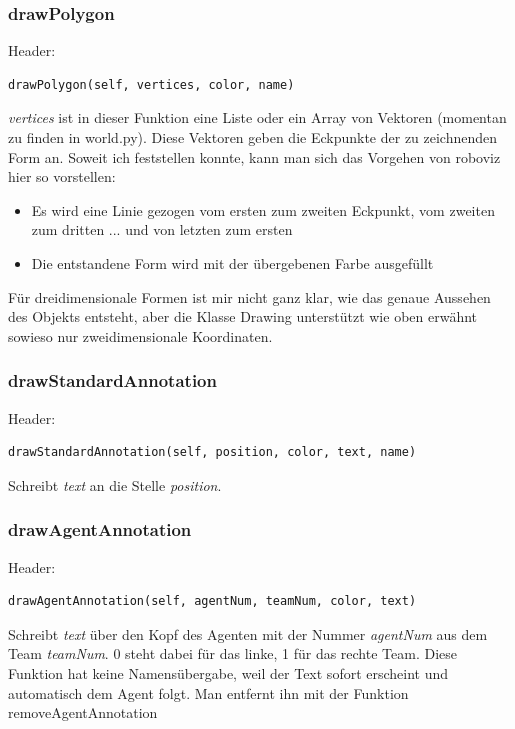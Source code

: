 \subsubsection*{drawPolygon}
Header:

\begin{verbatim}drawPolygon(self, vertices, color, name)
\end{verbatim}
\textit{vertices} ist in dieser Funktion eine Liste oder ein Array von 
Vektoren (momentan zu finden in world.py). Diese Vektoren geben die 
Eckpunkte der zu zeichnenden Form an. Soweit ich feststellen konnte, kann
 man sich das Vorgehen von roboviz hier so vorstellen:

\begin{itemize}
\item Es wird eine Linie gezogen vom ersten zum zweiten Eckpunkt, vom zweiten zum dritten ... und von letzten zum ersten
\item Die entstandene Form wird mit der übergebenen Farbe ausgefüllt
\end{itemize}
Für dreidimensionale Formen ist mir nicht ganz klar, wie das genaue 
Aussehen des Objekts entsteht, aber die Klasse Drawing unterstützt wie 
oben erwähnt sowieso nur zweidimensionale Koordinaten.

\subsubsection*{drawStandardAnnotation}
Header:

\begin{verbatim}drawStandardAnnotation(self, position, color, text, name)
\end{verbatim}
Schreibt \textit{text} an die Stelle \textit{position}.

\subsubsection*{drawAgentAnnotation}
Header:

\begin{verbatim}drawAgentAnnotation(self, agentNum, teamNum, color, text)
\end{verbatim}
Schreibt \textit{text} über den Kopf des Agenten mit der Nummer \textit{agentNum} aus dem Team \textit{teamNum}.
0 steht dabei für das linke, 1 für das rechte Team.
Diese Funktion hat keine Namensübergabe, weil der Text sofort erscheint und automatisch dem Agent folgt.
Man entfernt ihn mit der Funktion removeAgentAnnotation

